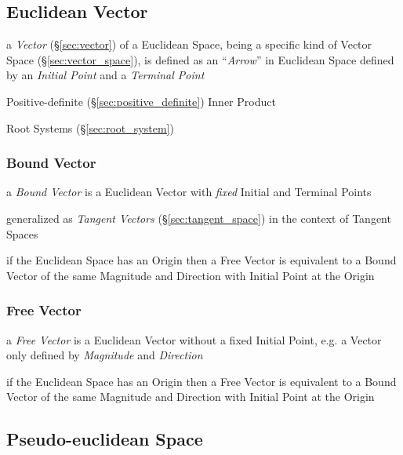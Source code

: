 \subsection{Euclidean Vector}\label{sec:euclidean_vector}

a \emph{Vector} (\S\ref{sec:vector}) of a Euclidean Space, being a specific
kind of Vector Space (\S\ref{sec:vector_space}), is defined as an
``\emph{Arrow}'' in Euclidean Space defined by an \emph{Initial Point} and a
\emph{Terminal Point}

Positive-definite (\S\ref{sec:positive_definite}) Inner Product

\fist Root Systems (\S\ref{sec:root_system})



\subsubsection{Bound Vector}\label{sec:bound_vector}

a \emph{Bound Vector} is a Euclidean Vector with \emph{fixed} Initial and
Terminal Points

generalized as \emph{Tangent Vectors} (\S\ref{sec:tangent_space}) in the
context of Tangent Spaces

if the Euclidean Space has an Origin then a Free Vector is equivalent to a
Bound Vector of the same Magnitude and Direction with Initial Point at the
Origin



\subsubsection{Free Vector}\label{sec:free_vector}

a \emph{Free Vector} is a Euclidean Vector without a fixed Initial Point, e.g.
a Vector only defined by \emph{Magnitude} and \emph{Direction}

if the Euclidean Space has an Origin then a Free Vector is equivalent to a
Bound Vector of the same Magnitude and Direction with Initial Point at the
Origin



\subsection{Pseudo-euclidean Space}\label{sec:pseudo_euclidean}

